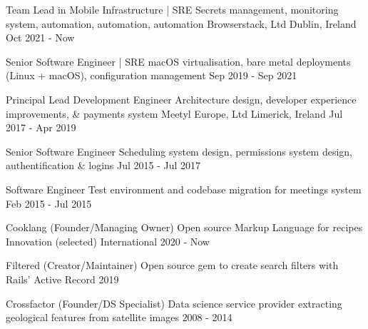 
\begin{cventries}

    \cvblitz
    {Team Lead in Mobile Infrastructure | SRE} %
    {Secrets management, monitoring system, automation, automation, automation}
    {Browserstack, Ltd} %
    {Dublin, Ireland} %
    {Oct 2021 - Now} %

    \cvblitz
    {Senior Software Engineer | SRE} %
    {macOS virtualisation, bare metal deployments (Linux + macOS), configuration management}
    {} %
    {} %
    {Sep 2019 - Sep 2021} %

    \cvblitz
    {Principal Lead Development Engineer} %
    {Architecture design, developer experience improvements, \& payments system}
    {Meetyl Europe, Ltd} %
    {Limerick, Ireland} %
    {Jul 2017 - Apr 2019} %

    \cvblitz
    {Senior Software Engineer} %
    {Scheduling system design, permissions system design, authentification \& logins} %
    {} %
    {} %
    {Jul 2015 - Jul 2017} %

    \cvblitz
    {Software Engineer} %
    {Test environment and codebase migration for meetings system} %
    {} %
    {} %
    {Feb 2015 - Jul 2015} %

    \cvblitz
    {Cooklang (Founder/Managing Owner)} %
    {Open source Markup Language for recipes} %
    {Innovation (selected)} %
    {International} %
    {2020 - Now} %

    \cvblitz
    {Filtered (Creator/Maintainer)} %
    {Open source gem to create search filters with Rails’ Active Record} %
    {} %
    {} %
    {2019} %

    \cvblitz
    {Crossfactor (Founder/DS Specialist)} %
    {Data science service provider extracting geological features from satellite images} %
    {} %
    {} %
    {2008 - 2014} %


\end{cventries}
